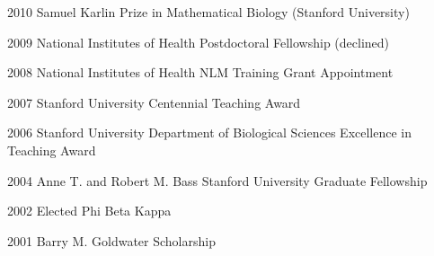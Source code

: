 \documentclass[centered,overlapped,line]{res}
\begin{document}
\begin{resume}
  \begin{compactitem}
  \item[2010] Samuel Karlin Prize in Mathematical Biology (Stanford University) 
  \item[2009] National Institutes of Health Postdoctoral Fellowship (declined)
  \item[2008] National Institutes of Health NLM Training Grant Appointment
  \item[2007] Stanford University Centennial Teaching Award
  \item[2006] Stanford University Department of Biological Sciences Excellence in Teaching Award
  \item[2004] Anne T. and Robert M. Bass Stanford University Graduate Fellowship
  \item[2002] Elected Phi Beta Kappa
  \item[2001] Barry M. Goldwater Scholarship
  \end{compactitem}



\end{resume}
\end{document}
